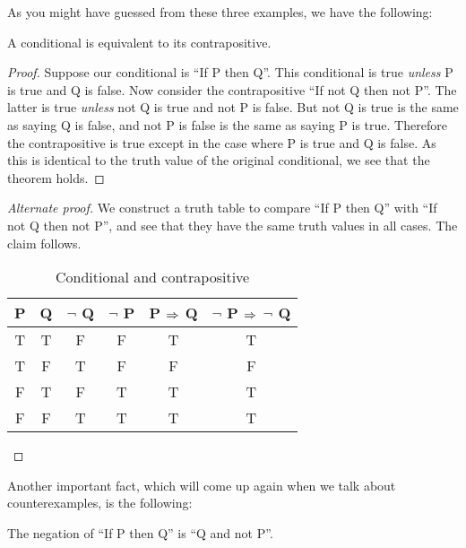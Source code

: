 \documentclass{tufte-book}
\begin{document}
As you might have guessed from these three examples, we have the following:
\begin{theorem}
  A conditional is equivalent to its contrapositive.
\end{theorem}

\begin{proof}
  Suppose our conditional is ``If P then Q''. This conditional is true \emph{unless} P is true and Q is false. Now consider the contrapositive ``If not Q then not P''. The latter is true \emph{unless} not Q is true and not P is false. But not Q is true is the same as saying Q is false, and not P is false is the same as saying P is true. Therefore the contrapositive is true except in the case where P is true and Q is false. As this is identical to the truth value of the original conditional, we see that the theorem holds.
\end{proof}

\begin{proof}[Alternate proof] 
  We construct a truth table to compare ``If P then Q'' with ``If not Q then not P'', and see that they have the same truth values in all cases. The claim follows.

  \begin{table}
    \centering
    \begin{tabular}{cccccc}
      \toprule
      P & Q & $\neg$ Q & $\neg$ P & P $\Rightarrow$ Q & $\neg$ P $\Rightarrow$ $\neg$ Q \\ \midrule 
      T & T & F & F & T & T \\
      T & F & T & F & F & F \\
      F & T & F & T & T & T \\
      F & F & T & T & T & T \\
      \bottomrule
    \end{tabular}
    \caption{Conditional and contrapositive}
    \label{tab:conditional-contrapositive}
  \end{table}
\end{proof}

Another important fact, which will come up again when we talk about counterexamples, is the following:
\begin{theorem}\label{thm:negation-conditional}
  The negation of ``If P then Q'' is ``Q and not P''.
\end{theorem}
\end{document}
